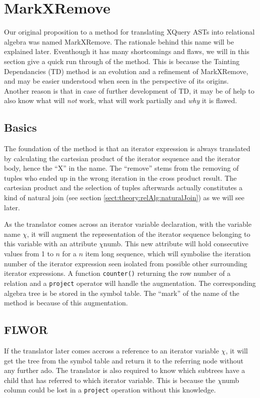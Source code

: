 \section{MarkXRemove}
\label{sect:trans:MarkXRemove}

Our original proposition to a method for translating XQuery ASTs into relational algebra was named MarkXRemove.
The rationale behind this name will be explained later. Eventhough it has many shortcomings and flaws, we
will in this section give a quick run through of the method. This is because the Tainting Dependancies (TD) method
is an evolution and a refinement of MarkXRemove, and may be easier understood when seen in the perspective of its
origins. Another reason is that in case of further development of TD, it may be of help to also know what will
\textit{not} work, what will work partially and \textit{why} it is flawed.

\subsection{Basics}
\label{sect:trans:mxr:basics}

The foundation of the method is that an iterator expression is always translated by calculating the cartesian
product of the iterator sequence and the iterator body, hence the ``X'' in the name. The ``remove'' stems from the
removing of tuples who ended up in the wrong iteration in the cross product result. The cartesian product and the
selection of tuples afterwards actually constitutes a kind of natural join (see section
\ref{sect:theory:relAlg:naturalJoin}) as we will see later.

As the translator comes across an iterator variable declaration, with the variable name $\chi$, it will augment
the representation of the iterator sequence belonging to this variable with an attribute $\chi$\textsf{numb}.
This new attribute will hold consecutive values from 1 to $n$ for a $n$ item long sequence, which will symbolise the
iteration number of the iterator expression seen isolated from possible other surrounding iterator expressions. A
function \texttt{counter()} returning the row number of a relation and a \texttt{project} operator will handle
the augmentation. The corresponding algebra tree is be stored in the symbol table. The ``mark'' of the name of the
method is because of this augmentation.

\subsection{FLWOR}
\label{sect:trans:mxr:flwor}
If the translator later comes accross a reference to an iterator variable $\chi$, it will get the tree from the
symbol table and return it to the referring node without any further ado. The translator is also required to know
which subtrees have a child that has referred to which iterator variable. This is because the $\chi$\textsf{numb}
column could be lost in a \texttt{project} operation without this knowledge.

